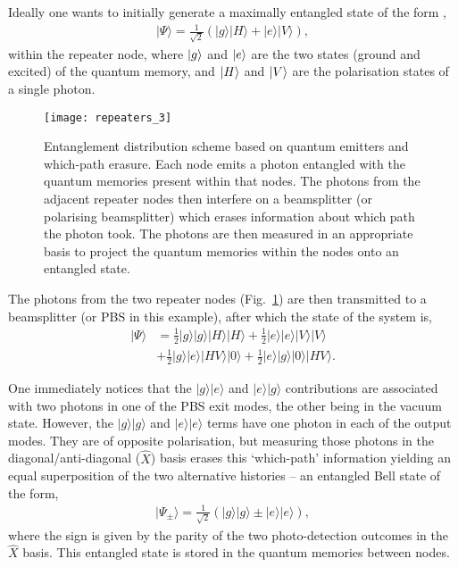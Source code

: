 Ideally one wants to initially generate a maximally entangled state of the form \cite{bib:WJM2015},
\begin{align}
|\Psi\rangle=\frac{1}{\sqrt{2}} (|g\rangle |H\rangle + |e\rangle |V\rangle),
\end{align}
within the repeater node, where $|g\rangle$ and $|e\rangle$ are the two states (ground and excited) of the quantum memory, and $|H\rangle$ and $|V\rangle$ are the polarisation states of a single photon. 
\begin{figure}[!htbp]
\texttt{[image: repeaters\_3]}
\captionspacefig \caption{Entanglement distribution scheme based on quantum emitters and which-path erasure. Each node emits a photon entangled with the quantum memories present within that nodes. The photons from the adjacent repeater nodes then interfere on a beamsplitter (or polarising beamsplitter) which erases information about which path the photon took. The photons are then measured in an appropriate basis to project the quantum memories within the nodes onto an entangled state.} 
\label{fig:repeaters_3}
\end{figure} 
The photons from the two repeater nodes (Fig.~\ref{fig:repeaters_3}) are then transmitted to a beamsplitter (or PBS in this example), after which the state of the system is,
\begin{align}
|\Psi\rangle &= \frac{1}{2} |g\rangle |g\rangle |H\rangle |H\rangle +\frac{1}{2} |e\rangle |e\rangle |V\rangle |V\rangle \nonumber \\
&+\frac{1}{2} |g\rangle |e\rangle |HV\rangle |0\rangle + \frac{1}{2} |e\rangle |g\rangle |0\rangle |HV\rangle. 
\end{align}

One immediately notices that the $|g\rangle |e\rangle$ and $|e\rangle |g\rangle$ contributions are associated with two photons in one of the PBS exit modes, the other being in the vacuum state. However, the $|g\rangle |g\rangle$ and $|e\rangle |e\rangle$ terms have one photon in each of the output modes. They are of opposite polarisation, but measuring those photons in the diagonal/anti-diagonal ($\hat{X}$) basis erases this `which-path' information yielding an equal superposition of the two alternative histories -- an entangled Bell state of the form,
\begin{align}
|\Psi_\pm\rangle=\frac{1}{\sqrt{2}} (|g\rangle |g\rangle \pm |e\rangle |e\rangle),
\end{align}
where the sign is given by the parity of the two photo-detection outcomes in the $\hat{X}$ basis. This entangled state is stored in the quantum memories between nodes. 

